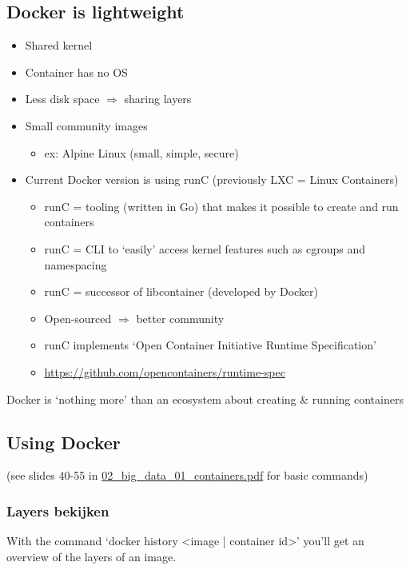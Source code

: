 \documentclass{article}
\begin{document}
\subsection{Docker is lightweight}

\begin{itemize}
    \item Shared kernel
    \item Container has no OS
    \item Less disk space $\Rightarrow$ sharing layers
    \item Small community images
    \begin{itemize}
        \item ex: Alpine Linux (small, simple, secure)
    \end{itemize}
    \item Current Docker version is using runC (previously LXC = Linux Containers)
    \begin{itemize}
        \item runC = tooling (written in Go) that makes it possible to create and run containers
        \item runC = CLI to `easily' access kernel features such as cgroups and namespacing
        \item runC = successor of libcontainer (developed by Docker)
        \item Open-sourced $\Rightarrow$ better community
        \item runC implements `Open Container Initiative Runtime Specification'
        \item \url{https://github.com/opencontainers/runtime-spec}
    \end{itemize}
\end{itemize}

Docker is `nothing more' than an ecosystem about creating \& running containers

\subsection{Using Docker}

(see slides 40-55 in \underline{02\_big\_data\_01\_containers.pdf} for basic commands)

\subsubsection{Layers bekijken}

With the command `docker history <image | container id>' you'll get an overview of the layers of an image.
\end{document}
